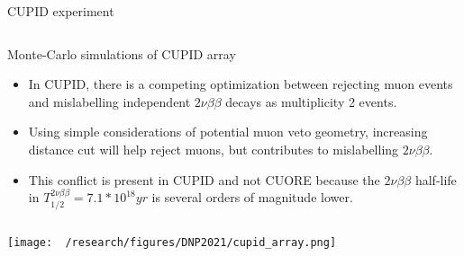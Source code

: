 \documentclass[final]{beamer}
\newlength{\colwidth}
\begin{document}
\begin{frame}[t]
\begin{columns}[t]
\begin{column}{\colwidth}
\begin{block}{CUPID experiment}
\begin{columns}[c]
      \column{.4\colwidth} %
        \begin{center}
        \end{center}
      
    \end{columns}


  \end{block}

  \begin{block}{Monte-Carlo simulations of CUPID array}
    \begin{itemize}
    \item In CUPID, there is a competing optimization between rejecting muon events and mislabelling independent $2\nu\beta\beta$ decays as multiplicity 2 events. 
    \item Using simple considerations of potential muon veto geometry, increasing distance cut will help reject muons, but contributes to mislabelling $2\nu\beta\beta$.
    \item This conflict is present in CUPID and not CUORE because the $2\nu\beta\beta$ half-life in $T_{1/2}^{2\nu\beta\beta} = 7.1* 10^{18} yr$ is several orders of magnitude lower.
    \end{itemize}
    \begin{columns}[c] %
      
      \column{.5\colwidth} %
      \texttt{[image: ~/research/figures/DNP2021/cupid\_array.png]}
      

\end{columns}
\end{block}
\end{column}
\end{columns}
\end{frame}
\end{document}
